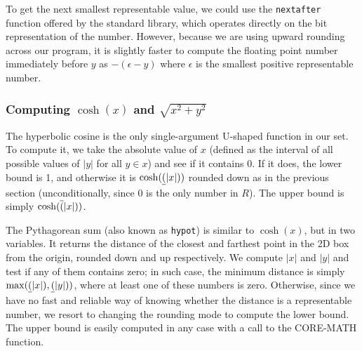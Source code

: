 To get the next smallest representable value, we could use the \texttt{nextafter} function offered by the standard library, which operates directly on the bit representation of the number. However, because we are using upward rounding across our program, it is slightly faster to compute the floating point number immediately before $y$ as $-(\epsilon-y)$ where $\epsilon$ is the smallest positive representable number.


\subsubsection{Computing $\cosh(x)$ and $\sqrt{x^2+y^2}$}
The hyperbolic cosine is the only single-argument U-shaped function in our set. To compute it, we take the absolute value of $x$ (defined as the interval of all possible values of $|y|$ for all $y\in x$) and see if it contains 0. If it does, the lower bound is 1, and otherwise it is $\cosh(\underline{(}|x|))$ rounded down as in the previous section (unconditionally, since 0 is the only number in $R$). The upper bound is simply $\cosh(\overline{(}|x|))$.

The Pythagorean sum (also known as \texttt{hypot}) is similar to $\cosh(x)$, but in two variables. It returns the distance of the closest and farthest point in the 2D box from the origin, rounded down and up respectively.
We compute $|x|$ and $|y|$ and test if any of them contains zero; in such case, the minimum distance is simply $\max(\underline{(}|x|), \underline{(}|y|))$, where at least one of these numbers is zero.
Otherwise, since we have no fast and reliable way of knowing whether the distance is a representable number, we resort to changing the rounding mode to compute the lower bound.
The upper bound is easily computed in any case with a call to the CORE-MATH function.

